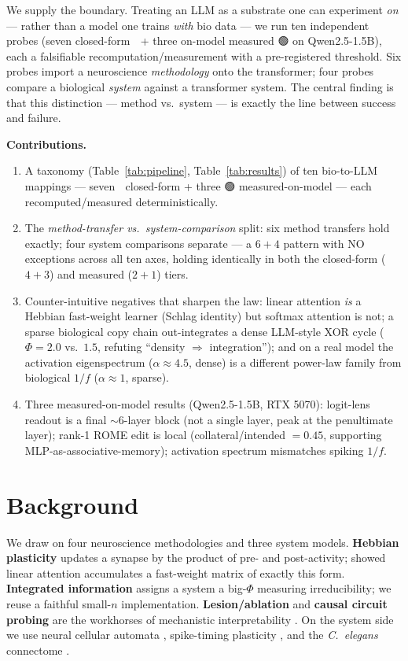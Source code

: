 \documentclass[11pt,a4paper]{article}
\providecommand{\tierBlue}{🔵}
\providecommand{\tierGreen}{🟢}
\begin{document}
We supply the boundary. Treating an LLM as a substrate one can
experiment \emph{on} --- rather than a model one trains \emph{with} bio
data --- we run ten independent probes (seven closed-form $\tierBlue$ +
three on-model measured $\tierGreen$ on Qwen2.5-1.5B), each a falsifiable
recomputation/measurement with a pre-registered threshold. Six probes
import a neuroscience \emph{methodology} onto the transformer; four probes
compare a biological \emph{system} against a transformer system. The
central finding is that this distinction --- method vs.\ system --- is
exactly the line between success and failure.

\medskip
\noindent\textbf{Contributions.}
\begin{enumerate}\itemsep0.3em
\item A taxonomy (Table~\ref{tab:pipeline}, Table~\ref{tab:results}) of
  ten bio-to-LLM mappings --- seven $\tierBlue$ closed-form + three
  $\tierGreen$ measured-on-model --- each recomputed/measured
  deterministically.
\item The \emph{method-transfer vs.\ system-comparison} split: six
  method transfers hold exactly; four system comparisons separate ---
  a $6{+}4$ pattern with NO exceptions across all ten axes, holding
  identically in both the closed-form ($4{+}3$) and measured ($2{+}1$)
  tiers.
\item Counter-intuitive negatives that sharpen the law: linear attention
  \emph{is} a Hebbian fast-weight learner (Schlag identity) but softmax
  attention is not; a sparse biological copy chain out-integrates a
  dense LLM-style XOR cycle ($\Phi=2.0$ vs.\ $1.5$, refuting
  ``density $\Rightarrow$ integration''); and on a real model the
  activation eigenspectrum ($\alpha\!\approx\!4.5$, dense) is a different
  power-law family from biological $1/f$ ($\alpha\!\approx\!1$, sparse).
\item Three measured-on-model results (Qwen2.5-1.5B, RTX 5070):
  logit-lens readout is a final $\sim$6-layer block (not a single layer,
  peak at the penultimate layer); rank-1 ROME edit is local
  (collateral/intended $=0.45$, supporting MLP-as-associative-memory);
  activation spectrum mismatches spiking $1/f$.
\end{enumerate}

\section{Background}
\label{sec:bg}

We draw on four neuroscience methodologies and three system models.
\textbf{Hebbian plasticity} \citep{hebb1949} updates a synapse by the
product of pre- and post-activity; \citet{schlag2021} showed linear
attention accumulates a fast-weight matrix of exactly this form.
\textbf{Integrated information} \citep{albantakis2023} assigns a system
a big-$\Phi$ measuring irreducibility; we reuse a faithful small-$n$
implementation. \textbf{Lesion/ablation} and \textbf{causal circuit
probing} are the workhorses of mechanistic interpretability
\citep{voita2019,michel2019,olsson2022,elhage2021}. On the system side
we use neural cellular automata \citep{mordvintsev2020}, spike-timing
plasticity \citep{bipoo1998}, and the \emph{C.\ elegans} connectome
\citep{white1986}.
\end{document}
